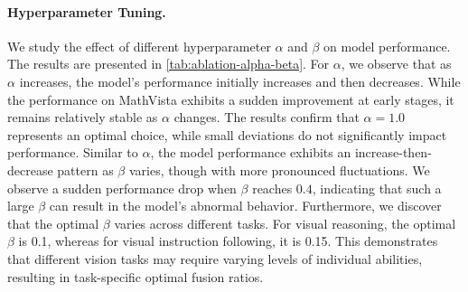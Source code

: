 \paragraph{Hyperparameter Tuning.}
We study the effect of different hyperparameter $\alpha$ and $\beta$ on model performance. The results are presented in \autoref{tab:ablation-alpha-beta}. 
For $\alpha$, we observe that as $\alpha$ increases, the model's performance initially increases and then decreases. 
While the performance on MathVista exhibits a sudden improvement at early stages, it remains relatively stable as $\alpha$ changes. The results confirm that $\alpha=1.0$ represents an optimal choice, while small deviations do not significantly impact performance.
Similar to  $\alpha$, the model performance exhibits an increase-then-decrease pattern as $\beta$ varies, though with more pronounced fluctuations. We observe a sudden performance drop when $\beta$ reaches $0.4$, indicating that such a large $\beta$ can result in the model's abnormal behavior. Furthermore, we discover that the optimal $\beta$ varies across different tasks. For visual reasoning, the optimal $\beta$ is 0.1, whereas for visual instruction following, it is 0.15. This demonstrates that different vision tasks may require varying levels of individual abilities, resulting in task-specific optimal fusion ratios.

\begin{table}[t]
  \centering
    \caption{The impact of fusion layer selection.}
    \label{tab:table-ablation-fl}
\end{table}

